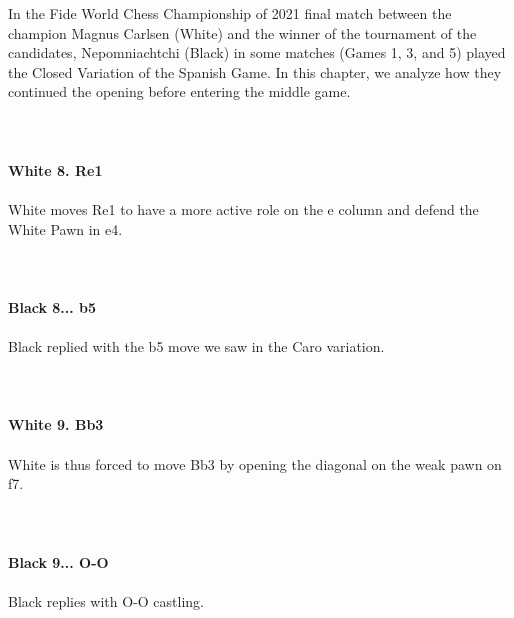 \documentclass{article}
\begin{document}
In the Fide World Chess Championship of 2021 final match between the champion Magnus Carlsen (White) and the winner of the tournament of the candidates, Nepomniachtchi (Black) in some matches (Games 1, 3, and 5) played the Closed Variation of the Spanish Game. In this chapter, we analyze how they continued the opening before entering the middle game.\\
\\

\\
\\
\textbf{White 8. Re1}\\
\\
White moves Re1 to have a more active role on the e column and defend the White Pawn in e4.\\
\\

\\
\\
\textbf{Black 8... b5}\\
\\
Black replied with the b5 move we saw in the Caro variation.\\
\\

\\
\\
\textbf{White 9. Bb3}\\
\\
White is thus forced to move Bb3 by opening the diagonal on the weak pawn on f7.\\
\\

\\
\\
\textbf{Black 9... O-O}\\
\\
Black replies with O-O castling.\\
\\
\end{document}
